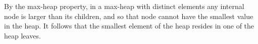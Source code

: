 By the max-heap property, in a max-heap with distinct elements any internal node is larger than its children, and so that node cannot have the smallest value in the heap.
It follows that the smallest element of the heap resides in one of the heap leaves.
